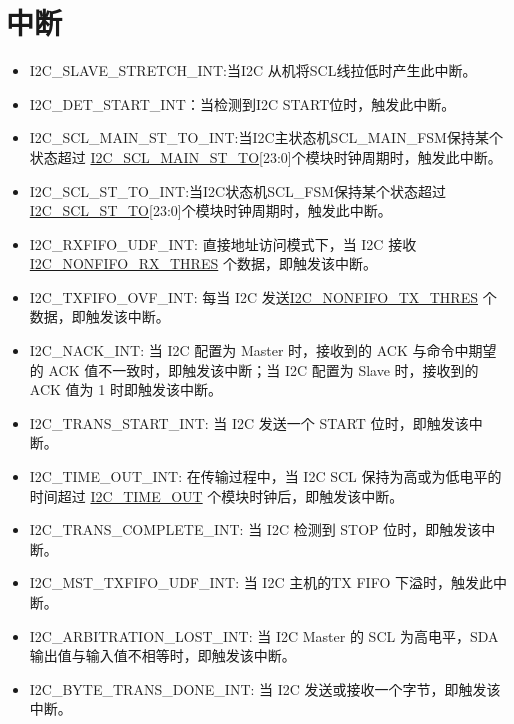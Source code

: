 \documentclass[main\_\_CN.tex]{subfiles}
\begin{document}
\section{中断}\label{5.3.7}
\begin{itemize}
\item \label{I2CEXTSLAVESTRETCHINT}I2C\_SLAVE\_STRETCH\_INT:当I2C 从机将SCL线拉低时产生此中断。
\item \label{I2CEXTDETSTARINT}I2C\_DET\_START\_INT：当检测到I2C START位时，触发此中断。
\item \label{I2CEXTSCLMAINSTTOINT}I2C\_SCL\_MAIN\_ST\_TO\_INT:当I2C主状态机SCL\_MAIN\_FSM保持某个状态超过 \hyperref[fielddesc:I2CSCLMAINSTTO]{I2C\_SCL\_MAIN\_ST\_TO}[23:0]个模块时钟周期时，触发此中断。
\item \label{I2CEXTSCLSTTOINT}I2C\_SCL\_ST\_TO\_INT:当I2C状态机SCL\_FSM保持某个状态超过 \hyperref[fielddesc:I2CSCLSTTO]{I2C\_SCL\_ST\_TO}[23:0]个模块时钟周期时，触发此中断。
\item \label{int:I2CEXTRXFIFOUDFINT}I2C\_RXFIFO\_UDF\_INT: 直接地址访问模式下，当 I2C 接收\hyperref[fielddesc:I2CNONFIFORXTHRES]{I2C\_NONFIFO\_RX\_THRES} 个数据，即触发该中断。
\item \label{int:I2CEXTTXFIFOOVFINT}I2C\_TXFIFO\_OVF\_INT: 每当 I2C 发送\hyperref[fielddesc:I2CNONFIFOTXTHRES]{I2C\_NONFIFO\_TX\_THRES} 个数据，即触发该中断。
\item \label{int:I2CEXTNACKINT}I2C\_NACK\_INT: 当 I2C 配置为 Master 时，接收到的 ACK 与命令中期望的 ACK 值不一致时，即触发该中断；当 I2C 配置为 Slave 时，接收到的 ACK 值为 1 时即触发该中断。
\item \label{int:I2CEXTTRANSSTARTINT}I2C\_TRANS\_START\_INT: 当 I2C 发送一个 START 位时，即触发该中断。
\item \label{int:I2CEXTTIMEOUTINT}I2C\_TIME\_OUT\_INT: 在传输过程中，当 I2C SCL 保持为高或为低电平的时间超过 \hyperref[fielddesc:I2CTIMEOUT]{I2C\_TIME\_OUT} 个模块时钟后，即触发该中断。
\item \label{int:I2CEXTTRANSCOMPLETEINT}I2C\_TRANS\_COMPLETE\_INT: 当 I2C 检测到 STOP 位时，即触发该中断。
\item \label{int:I2CEXTMSTTXFIFOUDFINT}I2C\_MST\_TXFIFO\_UDF\_INT: 当 I2C 主机的TX FIFO 下溢时，触发此中断。
\item \label{int:I2CEXTARBITRATIONLOSTINT}I2C\_ARBITRATION\_LOST\_INT: 当 I2C Master 的 SCL 为高电平，SDA 输出值与输入值不相等时，即触发该中断。
\item \label{int:I2CEXTBYTETRANSDONEINT}I2C\_BYTE\_TRANS\_DONE\_INT: 当 I2C 发送或接收一个字节，即触发该中断。

\end{itemize}
\end{document}
